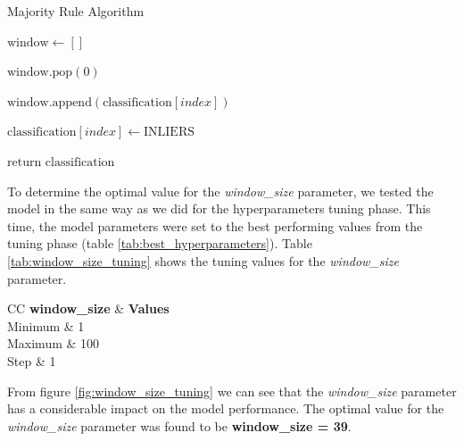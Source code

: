 \documentclass[futureinternet,article,submit,pdftex,moreauthors]{Definitions/mdpi}
\begin{document}
\begin{algorithm}
	\caption{Majority Rule Algorithm}
	\begin{algorithmic}[1]
		\State \hspace{1em} $\text{window} \leftarrow []$
		
				\State \hspace{1em} $\text{window.pop}(0)$
			\EndIf
			
			\State \hspace{1em} $\text{window.append}(\text{classification}[index])$
			
				\State \hspace{1em} $\text{classification}[index] \leftarrow \text{INLIERS}$
			\EndIf
		\EndFor
		
		\State \hspace{1em} $\text{return classification}$
	\end{algorithmic}
\end{algorithm}

To determine the optimal value for the \textit{window\_size} parameter, we tested the model in the same way as we did for the hyperparameters tuning phase. This time, the model parameters were set to the best performing values from the tuning phase (table \ref{tab:best_hyperparameters}). Table \ref{tab:window_size_tuning} shows the tuning values for the \textit{window\_size} parameter.

\begin{table}[H]
	\caption{window\_size tuning values.}\label{tab:window_size_tuning}
	\begin{tabularx}{\textwidth}{CC}
	\toprule
	\textbf{window\_size} & \textbf{Values} \\
	\midrule
	Minimum & 1 \\
	Maximum & 100 \\
	Step & 1 \\
	\bottomrule
\end{tabularx}
\end{table}

From figure \ref{fig:window_size_tuning} we can see that the \textit{window\_size} parameter has a considerable impact on the model performance. The optimal value for the \textit{window\_size} parameter was found to be \textbf{window\_size = 39}.
\end{document}
